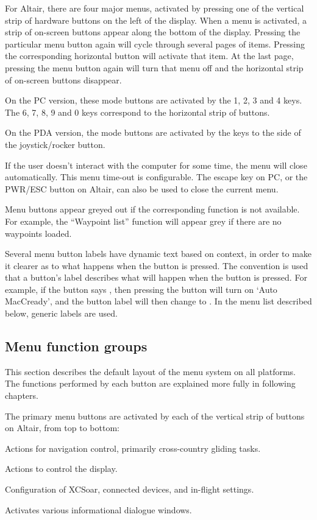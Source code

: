 For Altair, there are four major menus, activated by pressing one of
the vertical strip of hardware buttons on the left of the display.
When a menu is activated, a strip of on-screen buttons appear along the
bottom of the display.  Pressing the particular menu button again will
cycle through several pages of items.  Pressing the corresponding
horizontal button will activate that item.  At the last page, pressing
the menu button again will turn that menu off and the horizontal strip
of on-screen buttons disappear.

On the PC version, these mode buttons are activated by the
1, 2, 3 and 4 keys.  The 6, 7, 8, 9 and 0 keys correspond to the horizontal
strip of buttons.

On the PDA version, the mode buttons are activated by the keys to the
side of the joystick/rocker button.

If the user doesn't interact with the computer for some time, the
menu will close automatically.  This menu time-out is configurable.
The escape key on PC, or the PWR/ESC button on Altair, can
also be used to close the current menu.

Menu buttons appear greyed out if the corresponding function is not available.
For example, the ``Waypoint list'' function will appear grey if there are no waypoints loaded.

Several menu button labels have dynamic text based on context, in
order to make it clearer as to what happens when the button is
pressed.  The convention is used that a button's label describes what
will happen when the button is pressed.  For example, if the button
says , then pressing the button will turn on `Auto
MacCready', and the button label will then change to .
In the menu list described below, generic labels are used.

\subsection*{Menu function groups}
This section describes the default layout of the menu system on all
platforms.  The functions performed by each button are explained more
fully in following chapters.

The primary menu buttons are activated by each of the vertical strip of buttons
on Altair, from top to bottom:
\begin{jspecs}
\item[\bmenug{Nav}] Actions for navigation control, primarily cross-country
gliding tasks.
\item[\bmenug{Display}] Actions to control the display.
\item[\bmenug{Config}] Configuration of XCSoar, connected devices, and in-flight
settings.
\item[\bmenug{Info}] Activates various informational dialogue windows.
\end{jspecs}

